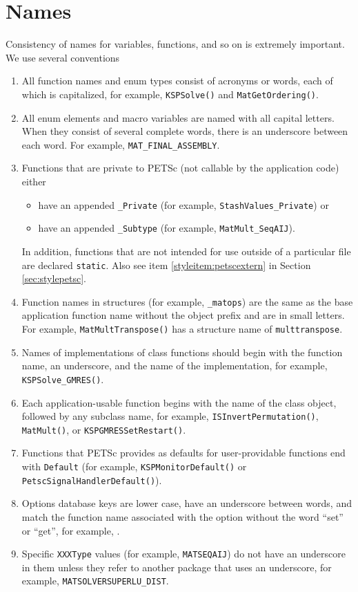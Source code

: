 \section{Names}\label{sec:stylenames}
Consistency of names for variables, functions, and so on is extremely
important.
We use several conventions
\begin{enumerate}
\item All function names and enum types consist of acronyms or words, each of
  which is capitalized, for example, \lstinline{KSPSolve()} and
      \lstinline{MatGetOrdering()}.
\item All enum elements and macro variables are named with all capital letters. When
      they consist of several complete words, there is an underscore between each word.
      For example, \lstinline{MAT_FINAL_ASSEMBLY}.
\item Functions that are private to PETSc (not callable by the
      application code) either
      \begin{itemize}
        \item have an appended \lstinline{_Private} (for example,
           \lstinline{StashValues_Private}) or
        \item have an appended \lstinline{_Subtype} (for example,
           \lstinline{MatMult_SeqAIJ}).
      \end{itemize}

      In addition, functions that are not intended for use outside
      of a particular file are declared \lstinline{static}.
      Also see item \ref{styleitem:petscextern} in Section \ref{sec:stylepetsc}.
\item Function names in structures (for example, \lstinline{_matops}) are the same as the base application
      function name without the object prefix and are in small letters.
      For example, \lstinline{MatMultTranspose()} has a structure name of
      \lstinline{multtranspose}.
\item Names of implementations of class functions should begin with the function name, an underscore, and the name of the implementation, for example, \lstinline{KSPSolve_GMRES()}.
\item Each application-usable function begins with the name of the class object, followed by any subclass name,
  for example, \lstinline{ISInvertPermutation()}, \lstinline{MatMult()}, or \lstinline{KSPGMRESSetRestart()}.
\item Functions that PETSc provides as defaults for user-providable functions end with \lstinline{Default} (for example, \lstinline{KSPMonitorDefault()} or \lstinline{PetscSignalHandlerDefault()}).
\item Options database keys are lower case, have an underscore between words, and match the function name associated with the option without the word ``set'' or ``get'',
for example, .
\item Specific \lstinline{XXXType} values (for example, \lstinline{MATSEQAIJ}) do not have an underscore in them unless they refer to another package that uses an underscore, for example, \lstinline{MATSOLVERSUPERLU_DIST}.
\end{enumerate}

